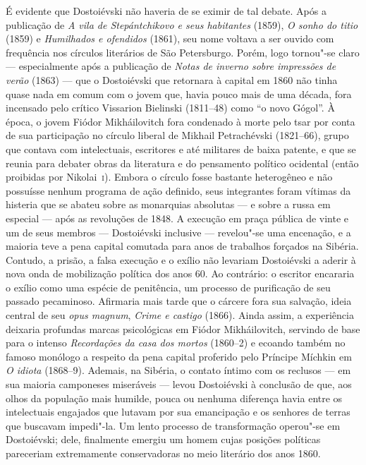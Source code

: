 É evidente que Dostoiévski não haveria de se eximir de tal debate. Após a
publicação de \textit{A vila de Stepántchikovo e seus habitantes} (1859),
\textit{O sonho do titio} (1859) e \textit{Humilhados e ofendidos} (1861), seu
nome voltava a ser ouvido com frequência nos círculos literários de São
Petersburgo. Porém, logo tornou"-se claro --- especialmente após a publicação de
\textit{Notas de inverno sobre impressões de verão} (1863) --- que o Dostoiévski
que retornara à capital em 1860 não tinha quase nada em comum com o jovem que,
havia pouco mais de uma década, fora incensado pelo crítico Vissarion Bielinski
(1811--48) como “o novo Gógol”. À época, o jovem Fiódor Mikháilovitch fora
condenado à morte pelo tsar por conta de sua participação no círculo liberal de
Mikhail Petrachévski (1821--66), grupo que contava com intelectuais, escritores
e até militares de baixa patente, e que se reunia para debater obras da
literatura e do pensamento político ocidental (então proibidas por Nikolai~\textsc{i}).
Embora o círculo fosse bastante heterogêneo e não possuísse nenhum programa de
ação definido, seus integrantes foram vítimas da histeria que se abateu sobre as
monarquias absolutas --- e sobre a russa em especial --- após as revoluções de
1848. A execução em praça pública de vinte e um de seus membros --- Dostoiévski
inclusive --- revelou"-se uma encenação, e a maioria teve a pena capital comutada
para anos de trabalhos forçados na Sibéria.  Contudo, a prisão, a falsa
execução e o exílio não levariam Dostoiévski a aderir à nova onda de
mobilização política dos anos 60. Ao contrário: o escritor encararia o exílio
como uma espécie de penitência, um processo de purificação de seu passado
pecaminoso. Afirmaria mais tarde que o cárcere fora sua salvação, ideia central
de seu \textit{opus magnum}, \textit{Crime e castigo} (1866). Ainda assim, a
experiência deixaria profundas marcas psicológicas em Fiódor Mikháilovitch,
servindo de base para o intenso \textit{Recordações da casa dos mortos}
(1860--2) e ecoando também no famoso monólogo a respeito da pena capital
proferido pelo Príncipe Míchkin em \textit{O idiota} (1868--9). Ademais, na
Sibéria, o contato íntimo com os reclusos --- em sua maioria camponeses
miseráveis --- levou Dostoiévski à conclusão de que, aos olhos da população mais
humilde, pouca ou nenhuma diferença havia entre os intelectuais engajados que
lutavam por sua emancipação e os senhores de terras que buscavam impedi"-la. Um
lento processo de transformação operou"-se em Dostoiévski; dele, finalmente
emergiu um homem cujas posições políticas pareceriam extremamente conservadoras
no meio literário dos anos 1860.


